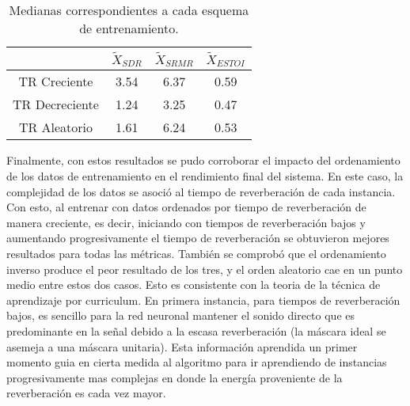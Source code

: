 \begin{table}[H]
\centering
\caption{Medianas correspondientes a cada esquema de entrenamiento.}
\begin{tabular}{|c|c|c|c|}
\hline
               & \textbf{$\tilde{X}_{SDR}$} & \textbf{$\tilde{X}_{SRMR}$} & \textbf{$\tilde{X}_{ESTOI}$} \\ \hline
TR Creciente   & 3.54         & 6.37          & 0.59           \\ \hline
TR Decreciente & 1.24         & 3.25          & 0.47           \\ \hline
TR Aleatorio   & 1.61         & 6.24          & 0.53           \\ \hline
\end{tabular}
\label{table:resultados_reverb}
\end{table}

Finalmente, con estos resultados se pudo corroborar el impacto del ordenamiento de los datos de entrenamiento en el rendimiento final del sistema. En este caso, la complejidad de los datos se asoció al tiempo de reverberación de cada instancia. Con esto, al entrenar con datos ordenados por tiempo de reverberación de manera creciente, es decir, iniciando con tiempos de reverberación bajos y aumentando progresivamente el tiempo de reverberación se obtuvieron mejores resultados para todas las métricas. También se comprobó que el ordenamiento inverso produce el peor resultado de los tres, y el orden aleatorio cae en un punto medio entre estos dos casos. Esto es consistente con la teoria de la técnica de aprendizaje por curriculum. En primera instancia, para tiempos de reverberación bajos, es sencillo para la red neuronal mantener el sonido directo que es predominante en la señal debido a la escasa reverberación (la máscara ideal se asemeja a una máscara unitaria). Esta información aprendida un primer momento guia en cierta medida al algoritmo para ir aprendiendo de instancias progresivamente mas complejas en donde la energía proveniente de la reverberación es cada vez mayor. 
